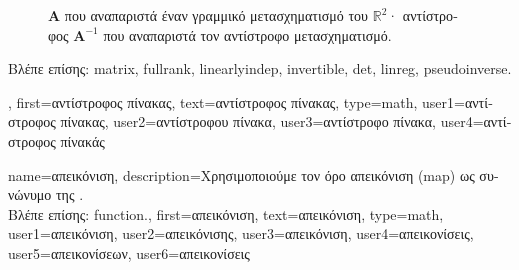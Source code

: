 {{\begin{figure}[H]
			{
 		\caption{ $\mathbf{A}$ \foreignlanguage{greek}{που αναπαριστά έναν 
			γραμμικό μετασχηματισμό του $\mathbb{R}^{2}$· αντίστροφος}  $\mathbf{A}^{-1}$ 
			\foreignlanguage{greek}{που αναπαριστά τον αντίστροφο μετασχηματισμό.} \label{fig_matrix_inverse_dict}} }
 		\end{figure}
		\foreignlanguage{greek}{Βλέπε επίσης:} \gls{matrix}, \gls{fullrank}, \gls{linearlyindep}, \gls{invertible}, \gls{det}, \gls{linreg}, \gls{pseudoinverse}.},
	first={\foreignlanguage{greek}{αντίστροφος πίνακας}},
	text={\foreignlanguage{greek}{αντίστροφος πίνακας}},
	type=math,
	user1={\foreignlanguage{greek}{αντίστροφος πίνακας}}, %
	user2={\foreignlanguage{greek}{αντίστροφου πίνακα}}, %
	user3={\foreignlanguage{greek}{αντίστροφο πίνακα}}, %
	user4={\foreignlanguage{greek}{αντίστροφος πίνακάς}} %
}

{name={\foreignlanguage{greek}{απεικόνιση}}, 
	description={\foreignlanguage{greek}{Χρησιμοποιούμε τον όρο απεικόνιση} 
		(map) \foreignlanguage{greek}{ως συνώνυμο της} .
		\\
		\foreignlanguage{greek}{Βλέπε επίσης:} \gls{function}.},
	first={\foreignlanguage{greek}{απεικόνιση}},
	text={\foreignlanguage{greek}{απεικόνιση}},
	type=math,
	user1={\foreignlanguage{greek}{απεικόνιση}}, %
  	user2={\foreignlanguage{greek}{απεικόνισης}}, %
	user3={\foreignlanguage{greek}{απεικόνιση}}, %
	user4={\foreignlanguage{greek}{απεικονίσεις}}, %
  	user5={\foreignlanguage{greek}{απεικονίσεων}}, %
	user6={\foreignlanguage{greek}{απεικονίσεις}} %
}

